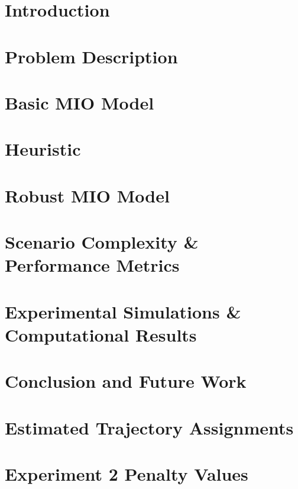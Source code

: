 \documentclass[12pt,twoside,leftblank]{mitthesis}
\begin{document}

\pagestyle{plain}


\chapter{Introduction}\label{ch: Intro}


\chapter{Problem Description}\label{ch:Problem Description}


\chapter{Basic MIO Model}\label{ch:Basic MIO Model}


\chapter{Heuristic} \label{ch:Heuristic}


\chapter{Robust MIO Model}\label{ch:Robust MIO Model}


\chapter{Scenario Complexity \& Performance Metrics} \label{ch:Scenario-Performance}

 
\chapter{Experimental Simulations \& Computational Results}\label{ch:Results}


\chapter{Conclusion and Future Work}\label{ch:Conclusion}


\appendix

\chapter{Estimated Trajectory Assignments}\label{ch:Assignment_Appendix}


\chapter{Experiment 2 Penalty Values}\label{ch:Penalty_Appendix}



\end{document}
